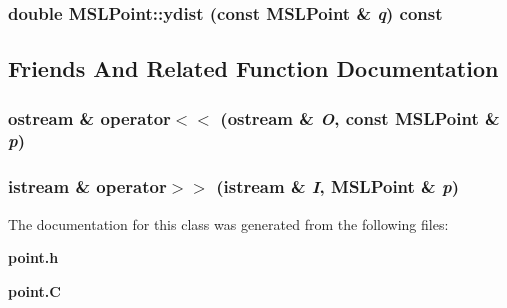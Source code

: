 \subsubsection{\setlength{\rightskip}{0pt plus 5cm}double MSLPoint::ydist (const MSLPoint \& {\em q}) const}\label{classMSLPoint_a9}




\subsection{Friends And Related Function Documentation}
\subsubsection{\setlength{\rightskip}{0pt plus 5cm}ostream \& operator$<$$<$ (ostream \& {\em O}, const MSLPoint \& {\em p})\hspace{0.3cm}{\tt  [friend]}}\label{classMSLPoint_l0}


\subsubsection{\setlength{\rightskip}{0pt plus 5cm}istream \& operator$>$$>$ (istream \& {\em I}, MSLPoint \& {\em p})\hspace{0.3cm}{\tt  [friend]}}\label{classMSLPoint_l1}




The documentation for this class was generated from the following files:\begin{CompactItemize}
\item 
{\bf point.h}\item 
{\bf point.C}\end{CompactItemize}

